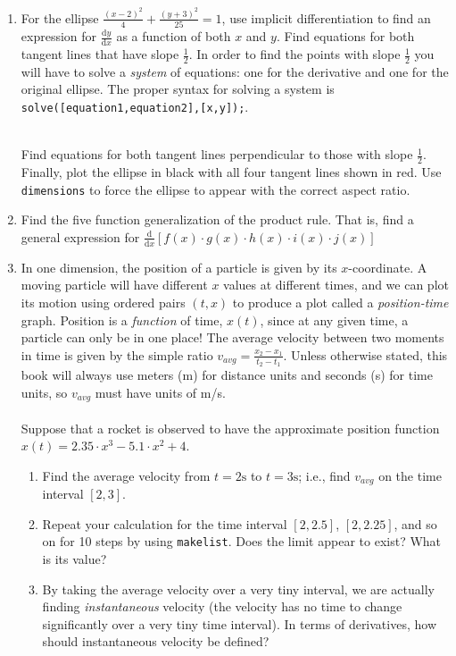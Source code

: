 \documentclass[10.5pt,twoside]{report}
\theoremstyle{definition}
\begin{document}
\begin{enumerate}
\item For the ellipse $\frac{(x-2)^2}{4}+\frac{(y+3)^2}{25}=1$, use implicit differentiation to find an expression for $\frac{\mathrm{d}y}{\mathrm{d}x}$ as a function of both $x$ and $y$.  Find equations for both tangent lines that have slope $\frac{1}{2}$. In order to find the points with slope $\frac{1}{2}$ you will have to solve a \textit{system} of equations:  one for the derivative and one for the original ellipse.  The proper syntax for solving a system is \verb|solve([equation1,equation2],[x,y]);|. 

${}$\\

Find equations for both tangent lines perpendicular to those with slope $\frac{1}{2}$.  Finally, plot the ellipse in black with all four tangent lines shown in red.  Use \verb|dimensions| to force the ellipse to appear with the correct aspect ratio.

\item Find the five function generalization of the product rule.  That is, find a general expression for $\frac{\mathrm{d}}{\mathrm{d}x}[f(x)\cdot g(x)\cdot h(x)\cdot i(x) \cdot j(x)]$

\item In one dimension, the position of a particle is given by its $x$-coordinate.  A moving particle will have different $x$ values at different times, and we can plot its motion using ordered pairs $(t,x)$ to produce a plot called a \textit{position-time} graph.  Position is a \textit{function} of time, $x(t)$, since at any given time, a particle can only be in one place!  The average velocity between two moments in time is given by the simple ratio $v_{avg}=\frac{x_2-x_1}{t_2-t_1}$.  Unless otherwise stated, this book will always use meters (m) for distance units and seconds (s) for time units, so $v_{avg}$ must have units of m/s.\\
${}$\\
Suppose that a rocket is observed to have the approximate position function \\ $x(t)=2.35 \cdot x^3-5.1 \cdot x^2+4$.  

 \begin{enumerate}
 
 \item Find the average velocity from $t=2 \mathrm{s}$ to $t=3 \mathrm{s}$; i.e., find $v_{avg}$ on the time interval $[2,3]$.
 
 \item Repeat your calculation for the time interval $[2,2.5]$, $[2,2.25]$, and so on for 10 steps by using \verb|makelist|.  Does the limit appear to exist?  What is its value?
 
 \item By taking the average velocity over a very tiny interval, we are actually finding \textit{instantaneous} velocity (the velocity has no time to change significantly over a very tiny time interval).  In terms of derivatives, how should instantaneous velocity be defined? 
 
 \end{enumerate}


\end{enumerate}
\end{document}
